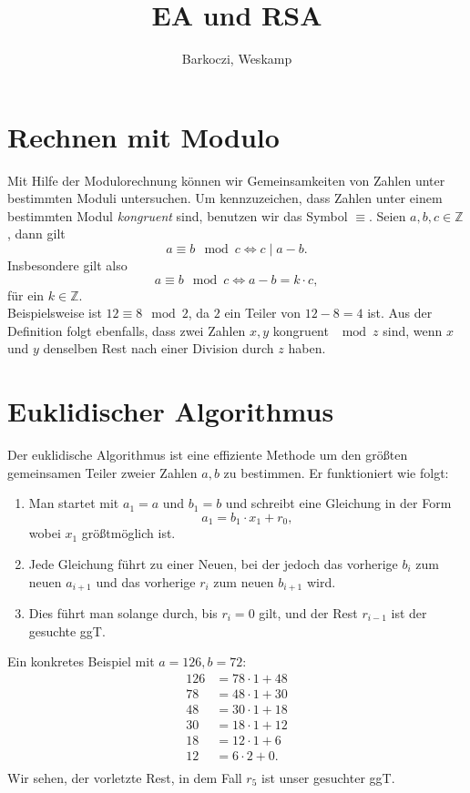 \documentclass[11pt]{article}
\title{\vspace{-4.7cm}EA und RSA}
\author{Barkoczi, Weskamp}
\date{}
\begin{document}
\maketitle
\section{Rechnen mit Modulo}
Mit Hilfe der Modulorechnung k\"onnen wir Gemeinsamkeiten von Zahlen unter bestimmten Moduli untersuchen. Um kennzuzeichen,
dass Zahlen unter einem bestimmten Modul \textit{kongruent} sind, benutzen wir das Symbol $\equiv$. Seien $a,b,c \in \mathbb{Z}$, dann
gilt 
\[
    a \equiv b \mod c \iff c \mid a-b.
\]
Insbesondere gilt also 
\[
    a \equiv b \mod c \iff a-b = k \cdot c,
\]
f\"ur ein $k \in \mathbb{Z}$.\\

Beispielsweise ist $12 \equiv 8 \mod 2$, da $2$ ein Teiler von $12-8=4$ ist.
Aus der Definition folgt ebenfalls, dass zwei Zahlen $x,y$ kongruent $\mod z$ sind, wenn 
$x$ und $y$ denselben Rest nach einer Division durch $z$ haben.

\section{Euklidischer Algorithmus}
Der euklidische Algorithmus ist eine effiziente Methode um den gr\"o{\ss}ten gemeinsamen
Teiler zweier Zahlen $a,b$ zu bestimmen. Er funktioniert wie folgt:
\begin{enumerate}
    \item Man startet mit $a_1 = a$ und $b_1 = b$ und schreibt eine Gleichung in der Form \[ a_1 = b_1 \cdot x_1 + r_0, \]
        wobei $x_1$ gr\"o{\ss}tm\"oglich ist.
    \item Jede Gleichung f\"uhrt zu einer Neuen, bei der jedoch das vorherige $b_i$ zum neuen $a_{i+1}$ und das vorherige
        $r_{i}$ zum neuen $b_{i+1}$ wird.
    \item Dies f\"uhrt man solange durch, bis $r_i = 0$ gilt, und der Rest $r_{i-1}$ ist der gesuchte ggT.
\end{enumerate}
Ein konkretes Beispiel mit $a=126, b=72$:\\
\begin{align*}
    126 &= 78 \cdot 1 + 48\\
    78 &= 48  \cdot 1 + 30\\
    48 &= 30  \cdot 1 + 18\\
    30 &= 18  \cdot 1 + 12\\
    18 &= 12  \cdot 1 + 6\\
    12 &= 6   \cdot 2 + 0.\\
\end{align*}
Wir sehen, der vorletzte Rest, in dem Fall $r_5$ ist unser gesuchter ggT.
\end{document}
